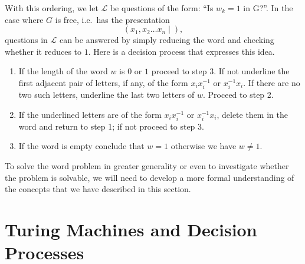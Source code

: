 With this ordering, we let $\mathcal{L}$ be questions of the form: ``Is $w_k = 1$ in G?''. In the case where $G$ is free, i.e.\ has the presentation
\begin{equation*}
  (x_1,x_2 \dots x_n \mid ),
\end{equation*}
questions in $\mathcal{L}$ can be answered by simply reducing the word and checking whether it reduces to $1$. Here is a decision process that expresses this idea.

\begin{enumerate}
\item If the length of the word $w$ is $0$ or $1$ proceed to step 3. If not underline the first adjacent pair of letters, if any, of the form $x_ix_i^{-1}$ or $x_i^{-1}x_i$. If there are no two such letters, underline the last two letters of $w$. Proceed to step 2.
\item If the underlined letters are of the form $x_ix_i^{-1}$ or $x_i^{-1}x_i$, delete them in the word and return to step 1; if not proceed to step 3.
\item If the word is empty conclude that $w = 1$ otherwise we have $w \neq 1$.
\end{enumerate}

To solve the word problem in greater generality or even to investigate  whether the problem is solvable, we will need to develop a more formal understanding of the concepts that we have described in this section.

\section{Turing Machines and Decision Processes}


